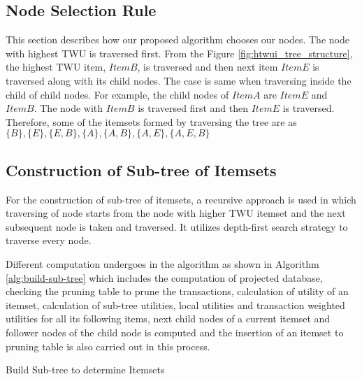 \documentclass[11pt,openright]{report}
\begin{document}
\subsection{Node Selection Rule} {
	This section describes how our proposed algorithm chooses our nodes. The node with highest TWU is traversed first. From the Figure \ref{fig:htwui_tree_structure}, the highest TWU item, $Item B$, is traversed and then next item $Item E$ is traversed along with its child nodes. The case is same when traversing inside the child of child nodes. For example, the child nodes of $Item A$ are $Item E$ and $Item B$. The node with $Item B$ is traversed first and then $Item E$ is traversed. Therefore, some of the itemsets formed by traversing the tree are as  $\{B\}, \{E\}, \{E,B\}, \{A\},\{A,B\}, \{A,E\}, \{A,E,B\}$
}

\subsection{Construction of Sub-tree of Itemsets} \label{ss:sub-tree-itemsets}
For the construction of sub-tree of itemsets, a recursive approach is used in which traversing of node starts from the node with higher TWU itemset and the next subsequent node is taken and traversed. It utilizes depth-first search strategy to traverse every node.

Different computation undergoes in the algorithm as shown in Algorithm \ref{alg:build-sub-tree} which includes the computation of projected database, checking the pruning table to prune the transactions, calculation of utility of an itemset, calculation of sub-tree utilities, local utilities and transaction weighted utilities for all its following items, next child nodes of a current itemset and follower nodes of the child node is computed and the insertion of an itemset to pruning table is also carried out in this process.

 {\SetAlgoNoLine
 	\begin{algorithm}[h]
 		\caption{Build Sub-tree to determine Itemsets}
 		\label{alg:build-sub-tree}
 	\end{algorithm}
 }
\end{document}
